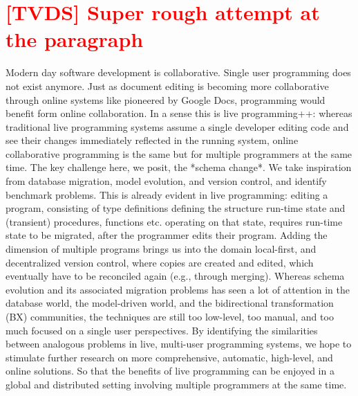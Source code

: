 \documentclass[english,submission]{programming}
\begin{document}


%
%
\printbibliography


\appendix

\section{\textcolor{red}{[TVDS] Super rough attempt at the paragraph}}

Modern day software development is collaborative. Single user programming does not exist anymore.
Just as document editing is becoming more collaborative through online systems like pioneered by Google Docs,
programming would benefit form online collaboration. In a sense this is live programming++: whereas traditional
live programming systems assume a single developer editing code and see their changes immediately reflected
in the running system, online collaborative programming is the same but for multiple programmers at the same time.
The key challenge here, we posit, the *schema change*. We take inspiration from database migration,
model evolution, and version control, and identify benchmark problems. This is already evident in live programming:
editing a program, consisting of type definitions defining the structure run-time state and (transient) procedures, functions
etc. operating on that state, requires run-time state to be migrated, after the programmer edits their program.
Adding the dimension of multiple programs brings us into the domain local-first, and decentralized version control, where
copies are created and edited, which eventually have to be reconciled again (e.g., through merging).
Whereas schema evolution and its associated migration problems has seen a lot of attention in the database world,
the model-driven world, and the bidirectional transformation (BX) communities, the techniques are still too low-level,
too manual, and too much focused on a single user perspectives. By identifying the similarities between analogous
problems in live, multi-user programming systems, we hope to stimulate further research on more comprehensive, automatic,
high-level, and online solutions. So that the benefits of live programming can be enjoyed in a global and distributed setting
involving multiple programmers at the same time.
\end{document}

